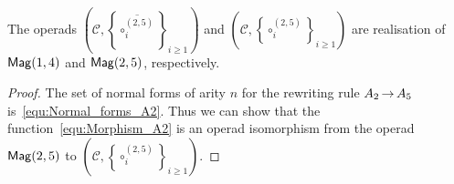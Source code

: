 \begin{Proposition} \label{prop:Realisation_Mag_1_4}
The operads 
$\left(\mathcal{C}, \left\{\overline{\circ_i^{(2,5)}}\right\}_{i \geq 1}
\right)$ and 
$\left(\mathcal{C}, \left\{\circ_i^{(2,5)}\right\}_{i \geq 1}\right)$ 
are realisation of $\mathsf{Mag}(1,4)$ and $\mathsf{Mag}(2,5)$, respectively.
\end{Proposition}

\begin{proof}
The set of normal forms of arity $n$ for the rewriting rule 
$A_2 \operatorname{\to} A_5$ is~\eqref{equ:Normal_forms_A2}. Thus we can show that
 the function~\eqref{equ:Morphism_A2}
is an operad isomorphism from the operad $\mathsf{Mag}(2,5)$ to 
$\left(\mathcal{C}, \left\{\circ_i^{(2,5)}\right\}_{i \geq 1}\right)$. 
\end{proof}

